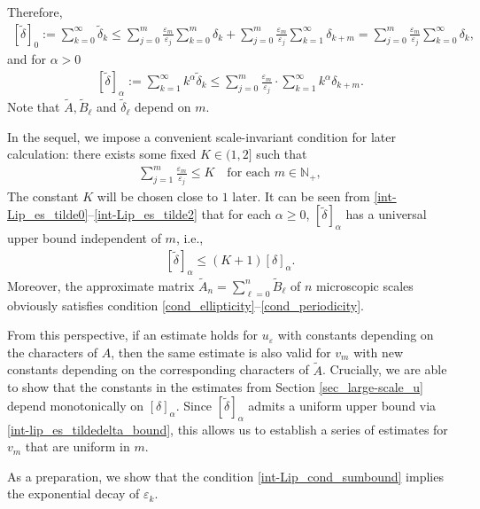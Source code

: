 \documentclass[reqno,12pt]{amsart} %
\theoremstyle{definition}
\theoremstyle{remark}
\numberwithin{equation}{section}
\newcommand{\N}{\mathbb{N}}
\newcommand{\e}{\varepsilon}
\begin{document}
Therefore,
\begin{align}\label{int-Lip_es_tilde0}
  [\widetilde{\delta}]_0:=\sum_{k=0}^\infty \widetilde{\delta}_k\leq \sum_{j=0}^m\frac{\varepsilon_m}{\varepsilon_j}\sum_{k=0}^m\delta_k+\sum_{j=0}^m\frac{\varepsilon_m}{\varepsilon_j} \sum_{k=1}^\infty\delta_{k+m}=\sum_{j=0}^m\frac{\varepsilon_m}{\varepsilon_j}\sum_{k=0}^\infty \delta_k, 
\end{align}
and for $\alpha>0$
\begin{align}\label{int-Lip_es_tilde2}
  [\widetilde{\delta}]_\alpha:=\sum_{k=1}^\infty k^\alpha\widetilde{\delta}_k\leq \sum_{j=0}^m\frac{\varepsilon_m}{\varepsilon_j}\cdot\sum_{k=1}^\infty k^\alpha\delta_{k+m}.
\end{align}
Note that $\widetilde{A}, \widetilde{B}_\ell$ and $\widetilde{\delta}_\ell$ depend on $m$.

In the sequel, we impose a convenient scale-invariant condition for later calculation: there exists some fixed $K\in (1, 2]$ such that
\begin{align}
  \label{int-Lip_cond_sumbound}
  \sum_{j=1}^{m}\frac{\varepsilon_m}{\varepsilon_j}\leq K\quad \text{for each }m \in \N_+,
\end{align}
The constant $K$ will be chosen close to $1$ later.
It can be seen from \eqref{int-Lip_es_tilde0}--\eqref{int-Lip_es_tilde2} that for each $\alpha\geq 0$, $[\widetilde{\delta}]_\alpha$ has a universal upper bound independent of $m$, i.e.,
\begin{align}\label{int-lip_es_tildedelta_bound}
  [\widetilde{\delta}]_\alpha\leq (K+1)[\delta]_\alpha.
\end{align}
Moreover, the approximate matrix $\widetilde{A}_n=\sum_{\ell=0}^n\widetilde{B}_\ell$ of $n$ microscopic scales obviously satisfies condition \eqref{cond_ellipticity}--\eqref{cond_periodicity}.

From this perspective, if an estimate holds for $u_\varepsilon$ with constants depending on the characters of $A$, then the same estimate is also valid for $v_m$ with new constants depending on the corresponding characters of $\widetilde{A}$. Crucially, we are able to show that the constants in the estimates from Section \ref{sec_large-scale_u} depend monotonically on $[\delta]_\alpha$. Since $[\widetilde{\delta}]_\alpha$ admits a uniform upper bound via \eqref{int-lip_es_tildedelta_bound}, this allows us to establish a series of estimates for $v_m$ that are uniform in $m$.

As a preparation, we show that the condition \eqref{int-Lip_cond_sumbound} implies the exponential decay of $\e_k$.
\end{document}
